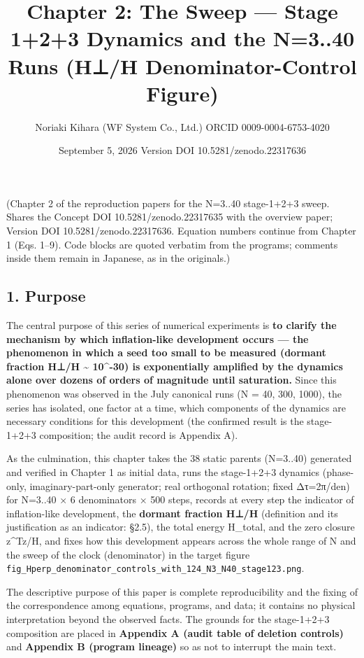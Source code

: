\documentclass[
  a4paper,
]{ltjsarticle}
\title{Chapter 2: The Sweep --- Stage 1+2+3 Dynamics and the N=3..40
Runs (H⊥/H Denominator-Control Figure)}
\author{Noriaki Kihara (WF System Co., Ltd.) ORCID 0009-0004-6753-4020}
\date{September 5, 2026 Version DOI 10.5281/zenodo.22317636}
\begin{document}
\maketitle

(Chapter 2 of the reproduction papers for the N=3..40 stage-1+2+3 sweep.
Shares the Concept DOI 10.5281/zenodo.22317635 with the overview paper;
Version DOI 10.5281/zenodo.22317636. Equation numbers continue from
Chapter 1 (Eqs. 1--9). Code blocks are quoted verbatim from the
programs; comments inside them remain in Japanese, as in the originals.)

\subsection{1. Purpose}\label{purpose}

The central purpose of this series of numerical experiments is
\textbf{to clarify the mechanism by which inflation-like development
occurs --- the phenomenon in which a seed too small to be measured
(dormant fraction H⊥/H \textasciitilde{} 10\^{}-30) is exponentially
amplified by the dynamics alone over dozens of orders of magnitude until
saturation.} Since this phenomenon was observed in the July canonical
runs (N = 40, 300, 1000), the series has isolated, one factor at a time,
which components of the dynamics are necessary conditions for this
development (the confirmed result is the stage-1+2+3 composition; the
audit record is Appendix A).

As the culmination, this chapter takes the 38 static parents (N=3..40)
generated and verified in Chapter 1 as initial data, runs the
stage-1+2+3 dynamics (phase-only, imaginary-part-only generator; real
orthogonal rotation; fixed Δτ=2π/den) for N=3..40 × 6 denominators × 500
steps, records at every step the indicator of inflation-like
development, the \textbf{dormant fraction H⊥/H} (definition and its
justification as an indicator: §2.5), the total energy H\_total, and the
zero closure \textbar z\^{}Tz\textbar/H, and fixes how this development
appears across the whole range of N and the sweep of the clock
(denominator) in the target figure
\texttt{fig\_Hperp\_denominator\_controls\_with\_124\_N3\_N40\_stage123.png}.

The descriptive purpose of this paper is complete reproducibility and
the fixing of the correspondence among equations, programs, and data; it
contains no physical interpretation beyond the observed facts. The
grounds for the stage-1+2+3 composition are placed in \textbf{Appendix A
(audit table of deletion controls)} and \textbf{Appendix B (program
lineage)} so as not to interrupt the main text.
\end{document}

